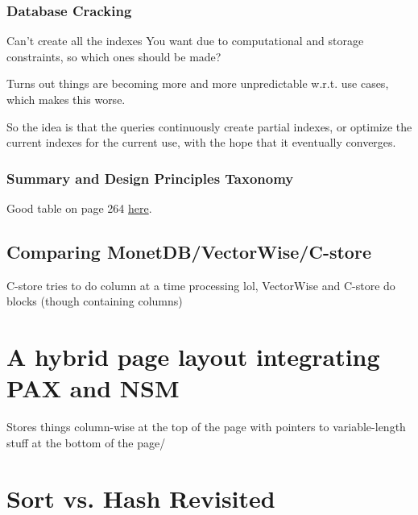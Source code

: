 \documentclass{article}
\begin{document}
		\subsubsection{Database Cracking}
		
			Can't create all the indexes You want due to computational and storage constraints, so which ones should be made?
			
			Turns out things are becoming more and more unpredictable w.r.t. use cases, which makes this worse.
			
			So the idea is that the queries continuously create partial indexes, or optimize the current indexes for the current use, with the hope that it eventually converges.
			
		\subsubsection{Summary and Design Principles Taxonomy}
		
			Good table on page 264 \href{https://stratos.seas.harvard.edu/files/stratos/files/columnstoresfntdbs.pdf}{here}.
	
	\subsection{Comparing MonetDB/VectorWise/C-store}
	
		C-store tries to do column at a time processing lol, VectorWise and C-store do blocks (though containing columns)
		
		
\newpage
\section{A hybrid page layout integrating PAX and NSM}

	Stores things column-wise at the top of the page with pointers to variable-length stuff at the bottom of the page/
			
		
		
		
			
			
		
	
		
		
		
		
		
		
		
		
		
		
\newpage
\section{Sort vs. Hash Revisited }
\end{document}
